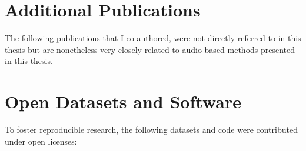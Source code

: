 \section*{Additional Publications}
The following publications that I co-authored, were not directly referred to in this thesis but are nonetheless very closely related to audio based methods presented in this thesis. 
\begin{refsection}
\nocite{*}
\printbibliography[env=numbered+bold, heading=none,resetnumbers=true]
\newrefcontext[sorting=nyt]
\end{refsection}

\vfill

\section*{Open Datasets and Software}
\label{sec:opendatasets}
To foster reproducible research, the following datasets and code were contributed under open licenses:
\begin{refsection}
\nocite{*}
\printbibliography[env=numbered+bold, heading=none,resetnumbers=true]
\newrefcontext[sorting=nyt]
\end{refsection}
